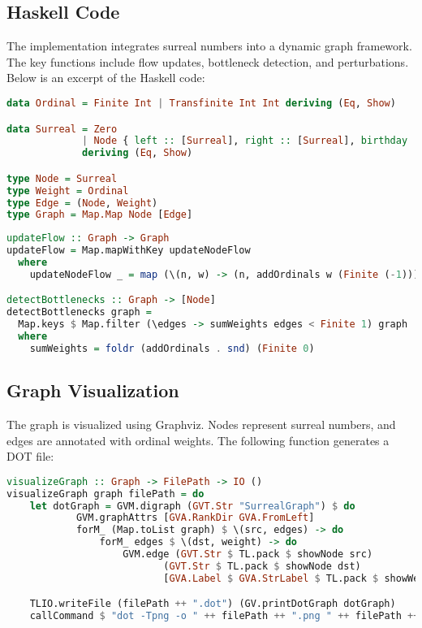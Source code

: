 \documentclass[12pt]{article}
\begin{document}
\subsection{Haskell Code}
The implementation integrates surreal numbers into a dynamic graph framework. The key functions include flow updates, bottleneck detection, and perturbations. Below is an excerpt of the Haskell code:

\begin{lstlisting}[language=Haskell, caption=Ordinal and Surreal Number Definitions]
data Ordinal = Finite Int | Transfinite Int Int deriving (Eq, Show)

data Surreal = Zero
             | Node { left :: [Surreal], right :: [Surreal], birthday :: Ordinal }
             deriving (Eq, Show)

type Node = Surreal
type Weight = Ordinal
type Edge = (Node, Weight)
type Graph = Map.Map Node [Edge]
\end{lstlisting}

\begin{lstlisting}[language=Haskell, caption=Flow Updates and Bottleneck Detection]
updateFlow :: Graph -> Graph
updateFlow = Map.mapWithKey updateNodeFlow
  where
    updateNodeFlow _ = map (\(n, w) -> (n, addOrdinals w (Finite (-1))))

detectBottlenecks :: Graph -> [Node]
detectBottlenecks graph =
  Map.keys $ Map.filter (\edges -> sumWeights edges < Finite 1) graph
  where
    sumWeights = foldr (addOrdinals . snd) (Finite 0)
\end{lstlisting}

\subsection{Graph Visualization}
The graph is visualized using Graphviz. Nodes represent surreal numbers, and edges are annotated with ordinal weights. The following function generates a DOT file:

\begin{lstlisting}[language=Haskell, caption=Graph Visualization with Graphviz]
visualizeGraph :: Graph -> FilePath -> IO ()
visualizeGraph graph filePath = do
    let dotGraph = GVM.digraph (GVT.Str "SurrealGraph") $ do
            GVM.graphAttrs [GVA.RankDir GVA.FromLeft]
            forM_ (Map.toList graph) $ \(src, edges) -> do
                forM_ edges $ \(dst, weight) -> do
                    GVM.edge (GVT.Str $ TL.pack $ showNode src)
                           (GVT.Str $ TL.pack $ showNode dst)
                           [GVA.Label $ GVA.StrLabel $ TL.pack $ showWeight weight]

    TLIO.writeFile (filePath ++ ".dot") (GV.printDotGraph dotGraph)
    callCommand $ "dot -Tpng -o " ++ filePath ++ ".png " ++ filePath ++ ".dot"
\end{lstlisting}
\end{document}
